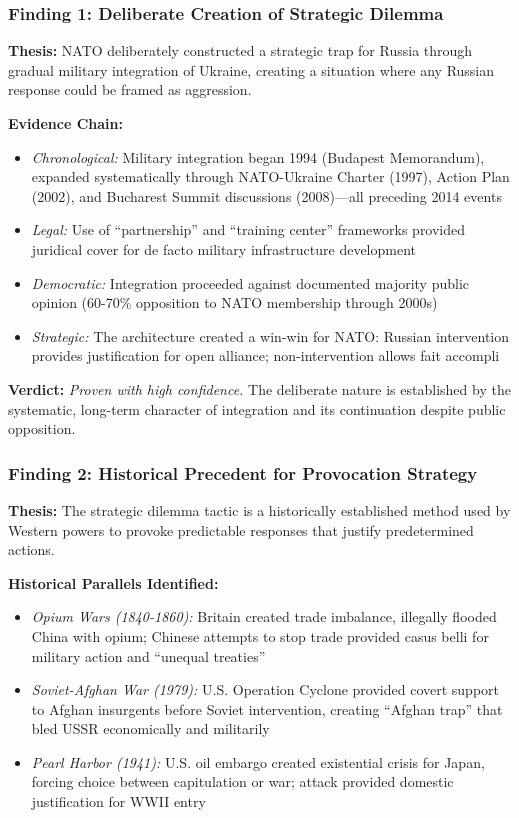 \documentclass[11pt,a4paper]{article}
\begin{document}
\subsubsection{Finding 1: Deliberate Creation of Strategic Dilemma}

\textbf{Thesis:} NATO deliberately constructed a strategic trap for Russia through gradual military integration of Ukraine, creating a situation where any Russian response could be framed as aggression.

\textbf{Evidence Chain:}
\begin{itemize}[nosep]
    \item \textit{Chronological:} Military integration began 1994 (Budapest Memorandum), expanded systematically through NATO-Ukraine Charter (1997), Action Plan (2002), and Bucharest Summit discussions (2008)---all preceding 2014 events
    \item \textit{Legal:} Use of ``partnership'' and ``training center'' frameworks provided juridical cover for de facto military infrastructure development
    \item \textit{Democratic:} Integration proceeded against documented majority public opinion (60-70\% opposition to NATO membership through 2000s)
    \item \textit{Strategic:} The architecture created a win-win for NATO: Russian intervention provides justification for open alliance; non-intervention allows fait accompli
\end{itemize}

\textbf{Verdict:} \textit{Proven with high confidence.} The deliberate nature is established by the systematic, long-term character of integration and its continuation despite public opposition.

\subsubsection{Finding 2: Historical Precedent for Provocation Strategy}

\textbf{Thesis:} The strategic dilemma tactic is a historically established method used by Western powers to provoke predictable responses that justify predetermined actions.

\textbf{Historical Parallels Identified:}
\begin{itemize}[nosep]
    \item \textit{Opium Wars (1840-1860):} Britain created trade imbalance, illegally flooded China with opium; Chinese attempts to stop trade provided casus belli for military action and ``unequal treaties''
    \item \textit{Soviet-Afghan War (1979):} U.S. Operation Cyclone provided covert support to Afghan insurgents before Soviet intervention, creating ``Afghan trap'' that bled USSR economically and militarily
    \item \textit{Pearl Harbor (1941):} U.S. oil embargo created existential crisis for Japan, forcing choice between capitulation or war; attack provided domestic justification for WWII entry
\end{itemize}
\end{document}
